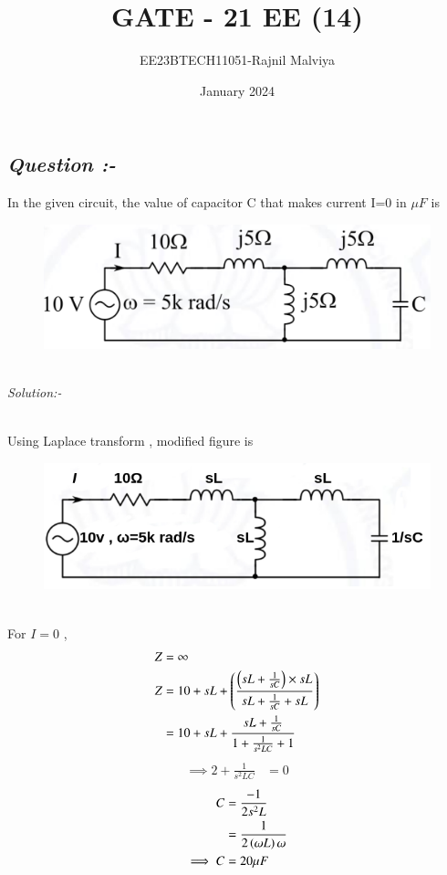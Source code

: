 \documentclass[journal,12pt,twocolumn]{IEEEtran}
\theoremstyle{remark}
\begin{document}
\title{GATE - 21 EE (14)}
\author{EE23BTECH11051-Rajnil Malviya}
\date{January 2024}
\maketitle
\subsection*{\textit{Question :-}}
In the given circuit, the value of capacitor C that makes current
I=0 in $\mu F$ is \\
\begin{figure}[h!]
   \includegraphics[width=1\linewidth]{2021/EE/14/figs/qf1.png}
\end{figure}\\
\textit{Solution:- }
\fi
\begin{table}[h!]
            
    \end{table}\\
Using Laplace transform , modified figure is 
\begin{figure}[h!]
   \includegraphics[width=1\linewidth]{2021/EE/14/figs/f2.png}
\end{figure}\\
For $I=0 $ , 
\begin{align}
Z & =\infty\\
    Z&=10+sL+\left(\frac{\left(sL+\frac{1}{sC}\right)\times sL}{sL+\frac{1}{sC}+ sL}\right)\\
&=10+sL+\frac{sL+\frac{1}{sC}}{1+\frac{1}{s^{2}LC}+1}
\end{align}
\begin{align}
 \implies   2+\frac{1}{s^{2}LC}&=0
\end{align}
\begin{align}
     C&=\frac{-1}{2s^2L}\\
       &=\frac{1}{2\left(\omega L\right)\omega }\\
       \implies C&= 20\mu F
\end{align}

\end{document}

